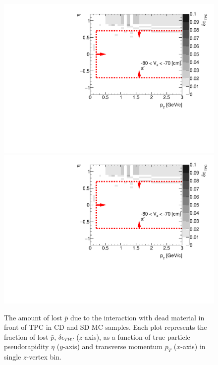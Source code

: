 \begin{figure}[H]
	\caption[The amount of lost $\bar{p}$ due to the interaction with dead material in front of TPC as a function of $p_T$, $\eta$ and $z$-vertex in CD and SD]{The amount of lost $\bar{p}$ due to the interaction with dead material in front of TPC in CD and SD MC samples. Each plot represents the fraction of lost $\bar{p}$, $\delta\epsilon_{ TPC}$ ($z$-axis), as a function of true particle pseudorapidity $\eta$ ($y$-axis) and transverse momentum $p_{T}$ ($x$-axis) in single $z$-vertex bin.}\label{fig:dead_materialCDSD3Dpbar}
	\parbox{0.325\textwidth}{
		\includegraphics[width=\linewidth,page=33]{graphics/systematicsEfficiency/deadMaterial/secondaries_Unbinned_SDCD_.pdf}\\
		\includegraphics[width=\linewidth,page=36]{graphics/systematicsEfficiency/deadMaterial/secondaries_Unbinned_SDCD_.pdf}\\
}
\end{figure}
